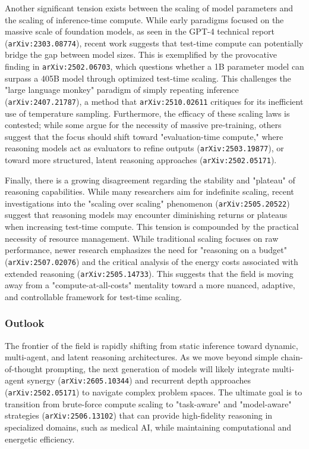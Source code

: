 \documentclass[11pt]{article}
\begin{document}
Another significant tension exists between the scaling of model parameters and the scaling of inference-time compute. While early paradigms focused on the massive scale of foundation models, as seen in the GPT-4 technical report (\texttt{arXiv:2303.08774}), recent work suggests that test-time compute can potentially bridge the gap between model sizes. This is exemplified by the provocative finding in \texttt{arXiv:2502.06703}, which questions whether a 1B parameter model can surpass a 405B model through optimized test-time scaling. This challenges the "large language monkey" paradigm of simply repeating inference (\texttt{arXiv:2407.21787}), a method that \texttt{arXiv:2510.02611} critiques for its inefficient use of temperature sampling. Furthermore, the efficacy of these scaling laws is contested; while some argue for the necessity of massive pre-training, others suggest that the focus should shift toward "evaluation-time compute," where reasoning models act as evaluators to refine outputs (\texttt{arXiv:2503.19877}), or toward more structured, latent reasoning approaches (\texttt{arXiv:2502.05171}).

Finally, there is a growing disagreement regarding the stability and "plateau" of reasoning capabilities. While many researchers aim for indefinite scaling, recent investigations into the "scaling over scaling" phenomenon (\texttt{arXiv:2505.20522}) suggest that reasoning models may encounter diminishing returns or plateaus when increasing test-time compute. This tension is compounded by the practical necessity of resource management. While traditional scaling focuses on raw performance, newer research emphasizes the need for "reasoning on a budget" (\texttt{arXiv:2507.02076}) and the critical analysis of the energy costs associated with extended reasoning (\texttt{arXiv:2505.14733}). This suggests that the field is moving away from a "compute-at-all-costs" mentality toward a more nuanced, adaptive, and controllable framework for test-time scaling.

\subsubsection{Outlook}

The frontier of the field is rapidly shifting from static inference toward dynamic, multi-agent, and latent reasoning architectures. As we move beyond simple chain-of-thought prompting, the next generation of models will likely integrate multi-agent synergy (\texttt{arXiv:2605.10344}) and recurrent depth approaches (\texttt{arXiv:2502.05171}) to navigate complex problem spaces. The ultimate goal is to transition from brute-force compute scaling to "task-aware" and "model-aware" strategies (\texttt{arXiv:2506.13102}) that can provide high-fidelity reasoning in specialized domains, such as medical AI, while maintaining computational and energetic efficiency.
\end{document}
